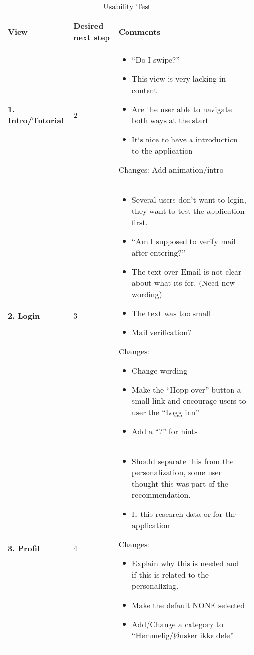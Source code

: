 {\begin{center}
\begin{longtable}{ | p{4cm} | p{3cm} | p{9cm}|}
		\caption[Usability test]{Usability Test } \label{Tab:usabilityTest}\\
		\hline
		\textbf{View} & \textbf{Desired next step} & \textbf{Comments}
		\\ \hline
		
			\textbf{1. Intro/Tutorial} & 2 & 
			\begin{itemize}
				\item “Do  I swipe?”
				\item This view is very lacking in content
				\item Are the user able to navigate both ways at the start
				\item It`s nice to have a introduction to the application
			\end{itemize}
			Changes:
			Add animation/intro
			\\\hline
			
			\textbf{2. Login} & 3  & 
			\begin{itemize}
			\item Several users don’t want to login, they want to test the application first.
			\item “Am I supposed to verify mail after entering?”
			\item	The text over Email is not clear about  what its for. (Need new wording)
			\item The text was too small
			\item Mail verification?
			\end{itemize}
			Changes:
			\begin{itemize}
			\item Change wording
			\item Make the “Hopp over” button a small link and encourage users to user the “Logg inn”
			\item  Add a “?” for hints
			\end{itemize}
			\\\hline
			
			\textbf{3. Profil} & 4 & 
			\begin{itemize}
			\item Should separate this from the personalization, some user thought this was part of the recommendation. 
			\item Is this research data or for the application
			\end{itemize}
			Changes:
			\begin{itemize}
			\item Explain why this is needed and if this is related to the personalizing.
			\item Make the default NONE selected
			\item Add/Change a category to “Hemmelig/Ønsker ikke dele”
			\end{itemize}
						\\\hline
						

\end{longtable}
\end{center}}
